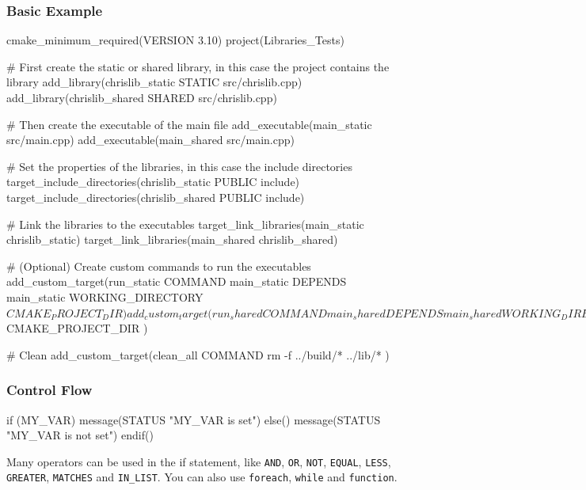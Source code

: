 \subsubsection*{Basic Example}
\begin{exampleblock}
\begin{codeblock}[language=bash]
cmake_minimum_required(VERSION 3.10)
project(Libraries_Tests)

# First create the static or shared library, in this case the project contains the library
add_library(chrislib_static STATIC src/chrislib.cpp)
add_library(chrislib_shared SHARED src/chrislib.cpp)

# Then create the executable of the main file
add_executable(main_static src/main.cpp)
add_executable(main_shared src/main.cpp)

# Set the properties of the libraries, in this case the include directories
target_include_directories(chrislib_static PUBLIC include)
target_include_directories(chrislib_shared PUBLIC include)

# Link the libraries to the executables
target_link_libraries(main_static chrislib_static)  
target_link_libraries(main_shared chrislib_shared)

# (Optional) Create custom commands to run the executables 
add_custom_target(run_static
    COMMAND main_static
    DEPENDS main_static
    WORKING_DIRECTORY ${CMAKE_PROJECT_DIR}
)

add_custom_target(run_shared
    COMMAND main_shared
    DEPENDS main_shared
    WORKING_DIRECTORY ${CMAKE_PROJECT_DIR}
)

# Clean
add_custom_target(clean_all
    COMMAND rm -f ../build/* ../lib/*
)
\end{codeblock}
\end{exampleblock}

\subsubsection*{Control Flow}

\begin{codeblock}[language=bash]
if (MY_VAR)
    message(STATUS "MY_VAR is set")
else()
    message(STATUS "MY_VAR is not set")
endif()
\end{codeblock}

Many operators can be used in the if statement, like \texttt{AND}, \texttt{OR}, \texttt{NOT}, \texttt{EQUAL}, \texttt{LESS}, \texttt{GREATER}, \texttt{MATCHES} and \texttt{IN\_LIST}.
You can also use \texttt{foreach}, \texttt{while} and \texttt{function}. 

